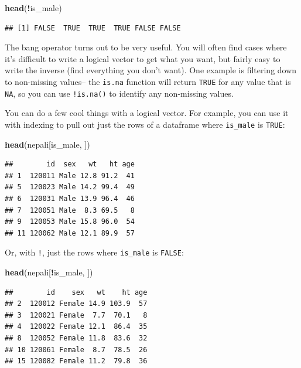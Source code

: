 \documentclass[]{book}
\makeatletter
\newenvironment{Shaded}{\begin{snugshade}}{\end{snugshade}}
\newcommand{\KeywordTok}[1]{\textcolor[rgb]{0.13,0.29,0.53}{\textbf{#1}}}
\newcommand{\OperatorTok}[1]{\textcolor[rgb]{0.81,0.36,0.00}{\textbf{#1}}}
\newcommand{\NormalTok}[1]{#1}
\newenvironment{kframe}{%
\medskip{}
\setlength{\fboxsep}{.8em}
 \def\at@end@of@kframe{}%
 \ifinner\ifhmode%
  \def\at@end@of@kframe{\end{minipage}}%
  \begin{minipage}{\columnwidth}%
 \fi\fi%
 \def\FrameCommand##1{\hskip\@totalleftmargin \hskip-\fboxsep
 \colorbox{shadecolor}{##1}\hskip-\fboxsep
     \hskip-\linewidth \hskip-\@totalleftmargin \hskip\columnwidth}%
 \MakeFramed {\advance\hsize-\width
   \@totalleftmargin\z@ \linewidth\hsize
   \@setminipage}}%
 {\par\unskip\endMakeFramed%
 \at@end@of@kframe}
\renewenvironment{Shaded}{\begin{kframe}}{\end{kframe}}
\theoremstyle{definition}
\theoremstyle{definition}
\theoremstyle{definition}
\theoremstyle{remark}
\makeatother
\begin{document}
\begin{Shaded}
\begin{Highlighting}[]
\KeywordTok{head}\NormalTok{(}\OperatorTok{!}\NormalTok{is_male)}
\end{Highlighting}
\end{Shaded}

\begin{verbatim}
## [1] FALSE  TRUE  TRUE  TRUE FALSE FALSE
\end{verbatim}

The bang operator turns out to be very useful. You will often find cases
where it's difficult to write a logical vector to get what you want, but
fairly easy to write the inverse (find everything you don't want). One
example is filtering down to non-missing values-- the \texttt{is.na}
function will return \texttt{TRUE} for any value that is \texttt{NA}, so
you can use \texttt{!is.na()} to identify any non-missing values.

You can do a few cool things with a logical vector. For example, you can
use it with indexing to pull out just the rows of a dataframe where
\texttt{is\_male} is \texttt{TRUE}:

\begin{Shaded}
\begin{Highlighting}[]
\KeywordTok{head}\NormalTok{(nepali[is_male, ])}
\end{Highlighting}
\end{Shaded}

\begin{verbatim}
##        id  sex   wt   ht age
## 1  120011 Male 12.8 91.2  41
## 5  120023 Male 14.2 99.4  49
## 6  120031 Male 13.9 96.4  46
## 7  120051 Male  8.3 69.5   8
## 9  120053 Male 15.8 96.0  54
## 11 120062 Male 12.1 89.9  57
\end{verbatim}

Or, with \texttt{!}, just the rows where \texttt{is\_male} is
\texttt{FALSE}:

\begin{Shaded}
\begin{Highlighting}[]
\KeywordTok{head}\NormalTok{(nepali[}\OperatorTok{!}\NormalTok{is_male, ])}
\end{Highlighting}
\end{Shaded}

\begin{verbatim}
##        id    sex   wt    ht age
## 2  120012 Female 14.9 103.9  57
## 3  120021 Female  7.7  70.1   8
## 4  120022 Female 12.1  86.4  35
## 8  120052 Female 11.8  83.6  32
## 10 120061 Female  8.7  78.5  26
## 15 120082 Female 11.2  79.8  36
\end{verbatim}
\end{document}
